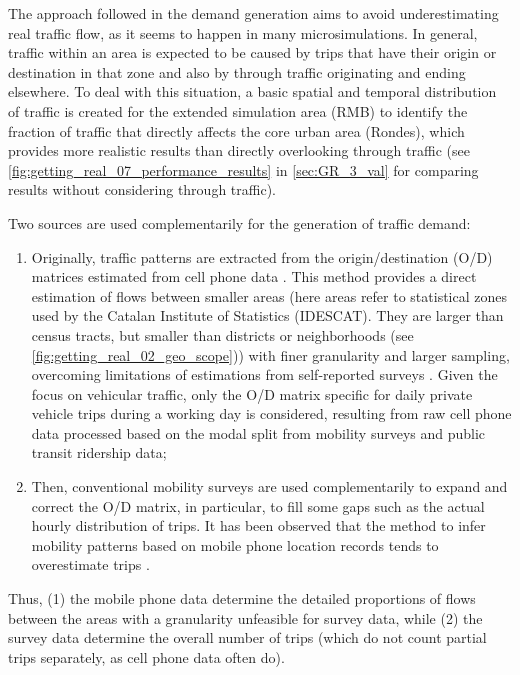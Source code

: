 The approach followed in the demand generation aims to avoid underestimating real traffic flow, as it seems to happen in many microsimulations. In general, traffic within an area is expected to be caused by trips that have their origin or destination in that zone and also by through traffic originating and ending elsewhere. To deal with this situation, a basic spatial and temporal distribution of traffic is created for the extended simulation area (RMB) to identify the fraction of traffic that directly affects the core urban area (Rondes), which provides more realistic results than directly overlooking through traffic (see \autoref{fig:getting_real_07_performance_results} in \autoref{sec:GR_3_val} for comparing results without considering through traffic).

Two sources are used complementarily for the generation of traffic demand:

\begin{enumerate}
    \item Originally, traffic patterns are extracted from the origin/destination (O/D) matrices estimated from cell phone data \citep{Calvet2020,Caceres2007}. This method provides a direct estimation of flows between smaller areas (here areas refer to statistical zones used by the Catalan Institute of Statistics (IDESCAT). They are larger than census tracts, but smaller than districts or neighborhoods (see \autoref{fig:getting_real_02_geo_scope})) with finer granularity and larger sampling, overcoming limitations of estimations from self-reported surveys \citep{Caceres2020}. Given the focus on vehicular traffic, only the O/D matrix specific for daily private vehicle trips during a working day is considered, resulting from raw cell phone data processed based on the modal split from mobility surveys and public transit ridership data;
    \item Then, conventional mobility surveys \citep{InstitutdEstudisRegionalsiMetropolitansdeBarcelonaIERMB2020,AreadeBarcelona.AutoritatdelTransportMetropolita2020} are used complementarily to expand and correct the O/D matrix, in particular, to fill some gaps such as the actual hourly distribution of trips. It has been observed that the method to infer mobility patterns based on mobile phone location records tends to overestimate trips \citep{Calvet2020}.
\end{enumerate}
Thus, (1) the mobile phone data determine the detailed proportions of flows between the areas with a granularity unfeasible for survey data, while (2) the survey data determine the overall number of trips (which do not count partial trips separately, as cell phone data often do).

